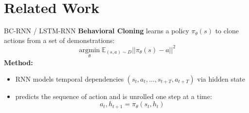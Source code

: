 \documentclass{beamer}
\begin{document}
\section{Related Work}

\begin{frame}[t]{BC-RNN / LSTM-RNN}
    \textbf{Behavioral Cloning} learns a policy $\pi_\theta(s)$ to clone actions from a set of demonstrations:
    \[
    \mathop{\arg \min}\limits_{\theta} \mathbb{E}_{(s,a) \sim \mathit{D}} || \pi_\theta(s) - a||^2
    \]
    \newline
    \pause
    \textbf{Method:}
    \small
    \begin{itemize}[label=-]
      \item RNN models temporal dependencies $(s_t, a_t, \dots, s_{t+T},a_{t+T})$ via hidden state
      \item predicts the sequence of action and is unrolled one step at a time: \[a_t, h_{t+1} = \pi_\theta(s_t, h_t)\]
    \end{itemize}
    

\end{frame}
\end{document}
